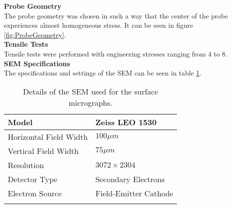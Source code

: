 \noindent \textbf{Probe Geometry} \\
The probe geometry was chosen in such a way that the center of the probe experiences almost homogeneous stress. It can be seen in figure \ref{fig:ProbeGeometry}. \\

\noindent \textbf{Tensile Tests}\\
Tensile tests were performed with engineering stresses ranging from $4$ to $8$. \\

\noindent \textbf{SEM Specifications} \\
The specifications and settings of the SEM can be seen in table \ref{tab:SEM}.\\

\begin{table}[H]
 \begin{center}
  \begin{tabular}{@{} *2l @{}} \toprule[2pt]
   Model & Zeiss LEO 1530 \\\midrule
   Horizontal Field Width & $100\mu m$   \\ 
   Vertical Field Width  & $75\mu m$ \\ 
   Resolution  & $3072\times 2304$ \\
   Detector Type & Secondary Electrons \\
   Electron Source & Field-Emitter Cathode \\ \bottomrule[2pt]

   \label{tab:SEM}
  \end{tabular}
 \end{center}
 \caption{Details of the SEM used for the surface micrographs.}
\end{table}
